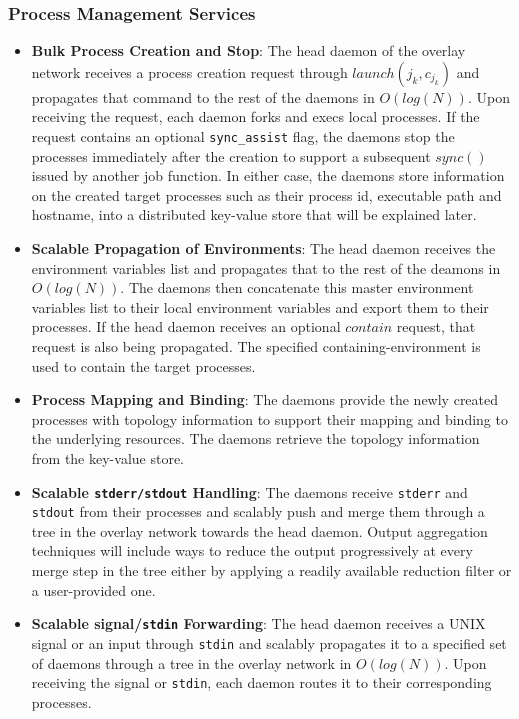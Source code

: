 \documentclass[10pt]{article}
\begin{document}
\subsubsection{Process Management Services}
\label{sect:procman}

\begin{itemize}
\item{{\bf Bulk Process Creation and Stop}: The head daemon of the overlay network
receives a process creation request 
through $launch(j_k, c_{j_k})$ and propagates that command to the rest of the daemons 
in $O(log(N))$. Upon receiving the request, each daemon forks and execs 
local processes. If the request contains an optional {\tt sync\_assist} flag, the daemons
stop the processes immediately after the creation to support a subsequent $sync()$ issued 
by another job function. In either case, the daemons store
information on the created target processes such as their process id, executable path
and hostname, into a distributed key-value store that will be explained later.}

\item{{\bf Scalable Propagation of Environments}: The head daemon receives the environment
variables list and propagates that to the rest of the deamons
in $O(log(N))$. The daemons then concatenate this master environment variables
list to their local environment variables and export them to their
processes. If the head daemon receives an optional $contain$ request, that
request is also being propagated. The specified containing-environment is used to contain
the target processes.} 

\item{{\bf Process Mapping and Binding}: The daemons provide the newly created processes 
with topology information to support their mapping and binding to the underlying 
resources. The daemons retrieve the topology information from the key-value store.} 

\item{{\bf Scalable {\tt stderr/stdout} Handling}: The daemons receive 
{\tt stderr} and {\tt stdout} 
from their processes and scalably push and merge them through a tree in the overlay
network towards the head daemon. Output aggregation techniques
will include ways to reduce the output progressively at every merge step 
in the tree either by applying a readily available 
reduction filter or a user-provided one.} 

\item{{\bf Scalable signal/{\tt stdin} Forwarding}: The head daemon receives a UNIX signal
or an input through {\tt stdin} and scalably propagates it to a specified set of daemons 
through a tree in the overlay network in $O(log(N))$. Upon receiving the signal or {\tt stdin}, 
each daemon routes it to their corresponding processes.}


\end{itemize}
\end{document}
